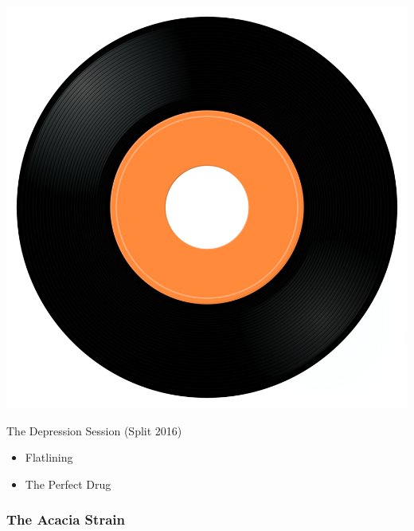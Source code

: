 \begin{minipage}[t]{0.25\textwidth}\vspace{0pt}
\captionsetup{type=figure}
\includegraphics[width=\textwidth]{Images/cover.png}
\caption*{The Depression Session (Split 2016)}
\end{minipage}
\begin{minipage}[t]{0.25\textwidth}\vspace{0pt}
\begin{itemize}[nosep,leftmargin=1em,labelwidth=*,align=left]
	\setlength{\itemsep}{0pt}
	\item Flatlining
	\item The Perfect Drug
\end{itemize}
\end{minipage}

\subsubsection{The Acacia Strain}

